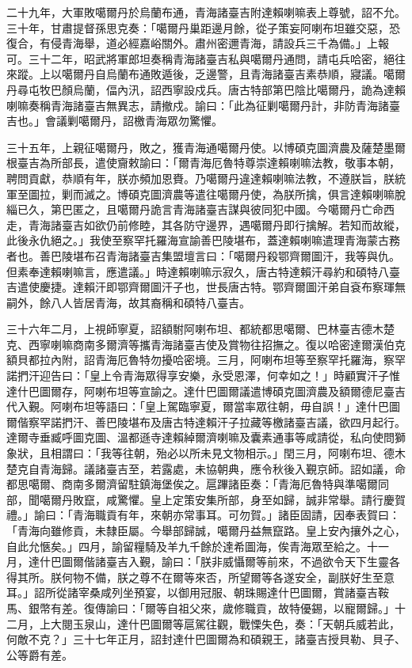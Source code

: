 \begin{pinyinscope}
二十九年，大軍敗噶爾丹於烏蘭布通，青海諸臺吉附達賴喇嘛表上尊號，詔不允。三十年，甘肅提督孫思克奏：「噶爾丹巢距邊月餘，從子策妄阿喇布坦雖交惡，恐復合，有侵青海舉，道必經嘉峪關外。肅州密邇青海，請設兵三千為備。」上報可。三十二年，昭武將軍郎坦奏稱青海諸臺吉私與噶爾丹通問，請屯兵哈密，絕往來蹤。上以噶爾丹自烏蘭布通敗遁後，乏邊警，且青海諸臺吉素恭順，寢議。噶爾丹尋屯牧巴顏烏蘭，偪內汛，詔西寧設戍兵。唐古特部第巴陰比噶爾丹，詭為達賴喇嘛奏稱青海諸臺吉無異志，請撤戍。諭曰：「此為征剿噶爾丹計，非防青海諸臺吉也。」會議剿噶爾丹，詔檄青海眾勿驚懼。

三十五年，上親征噶爾丹，敗之，獲青海通噶爾丹使。以博碩克圖濟農及薩楚墨爾根臺吉為所部長，遣使齎敕諭曰：「爾青海厄魯特尊崇達賴喇嘛法教，敬事本朝，聘問貢獻，恭順有年，朕亦頻加恩賚。乃噶爾丹違達賴喇嘛法教，不遵朕旨，朕統軍至圖拉，剿而滅之。博碩克圖濟農等遣往噶爾丹使，為朕所擒，俱言達賴喇嘛脫緇已久，第巴匿之，且噶爾丹詭言青海諸臺吉謀與彼同犯中國。今噶爾丹亡命西走，青海諸臺吉如欲仍前修睦，其各防守邊界，遇噶爾丹即行擒解。若知而故縱，此後永仇絕之。」我使至察罕托羅海宣諭善巴陵堪布，蓋達賴喇嘛遣理青海蒙古務者也。善巴陵堪布召青海諸臺吉集盟壇言曰：「噶爾丹殺鄂齊爾圖汗，我等與仇。但素奉達賴喇嘛言，應遣議。」時達賴喇嘛示寂久，唐古特達賴汗尋約和碩特八臺吉遣使慶捷。達賴汗即鄂齊爾圖汗子也，世長唐古特。鄂齊爾圖汗弟自袞布察琿無嗣外，餘八人皆居青海，故其裔稱和碩特八臺吉。

三十六年二月，上視師寧夏，詔額駙阿喇布坦、都統都思噶爾、巴林臺吉德木楚克、西寧喇嘛商南多爾濟等攜青海諸臺吉使及賞物往招撫之。復以哈密達爾漢伯克額貝都拉內附，詔青海厄魯特勿擾哈密境。三月，阿喇布坦等至察罕托羅海，察罕諾捫汗迎告曰：「皇上令青海眾得享安樂，永受恩澤，何幸如之！」時顧實汗子惟達什巴圖爾存，阿喇布坦等宣諭之。達什巴圖爾議遣博碩克圖濟農及額爾德尼臺吉代入覲。阿喇布坦等語曰：「皇上駕臨寧夏，爾當率眾往朝，毋自誤！」達什巴圖爾偕察罕諾捫汗、善巴陵堪布及唐古特達賴汗子拉藏等檄諸臺吉議，欲四月起行。達爾寺垂臧呼圖克圖、溫都遜寺達賴綽爾濟喇嘛及囊素通事等咸請從，私向使問獅象狀，且相謂曰：「我等往朝，殆必以所未見文物相示。」閏三月，阿喇布坦、德木楚克自青海歸。議諸臺吉至，若露處，未協朝典，應令秋後入覲京師。詔如議，命都思噶爾、商南多爾濟留駐鎮海堡俟之。扈蹕諸臣奏：「青海厄魯特與準噶爾同部，聞噶爾丹敗竄，咸驚懼。皇上定策安集所部，身至如歸，誠非常舉。請行慶賀禮。」諭曰：「青海職貢有年，來朝亦常事耳。可勿賀。」諸臣固請，因奉表賀曰：「青海向雖修貢，未隸臣屬。今舉部歸誠，噶爾丹益無竄路。皇上安內攘外之心，自此允愜矣。」四月，諭留糧騎及羊九千餘於達希圖海，俟青海眾至給之。十一月，達什巴圖爾偕諸臺吉入覲，諭曰：「朕非威懾爾等前來，不過欲令天下生靈各得其所。朕何物不備，朕之尊不在爾等來否，所望爾等各遂安全，副朕好生至意耳。」詔所從諸宰桑咸列坐預宴，以御用冠服、朝珠賜達什巴圖爾，賞諸臺吉鞍馬、銀幣有差。復傳諭曰：「爾等自祖父來，歲修職貢，故特優錫，以寵爾歸。」十二月，上大閱玉泉山，達什巴圖爾等扈駕往觀，戰慄失色，奏：「天朝兵威若此，何敵不克？」三十七年正月，詔封達什巴圖爾為和碩親王，諸臺吉授貝勒、貝子、公等爵有差。


\end{pinyinscope}
